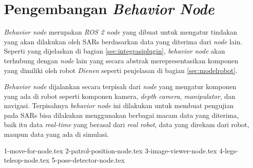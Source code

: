 \section{Pengembangan \emph{Behavior Node}}
\label{sec:behaviornode}

\emph{Behavior node} merupakan \emph{ROS 2 node} yang dibuat untuk mengatur tindakan yang akan dilakukan oleh SARs berdasarkan data yang diterima dari \emph{node} lain.
Seperti yang dijelaskan di bagian \ref{sec:integrasiplugin},
  \emph{behavior node} akan terhubung dengan \emph{node} lain yang secara abstrak merepresentasikan komponen yang dimiliki oleh robot \emph{Dienen} seperti penjelasan di bagian \ref{sec:modelrobot}.

\emph{Behavior node} dijalankan secara terpisah dari \emph{node} yang mengatur komponen yang ada di robot seperti komponen kamera, \emph{depth camera}, \emph{manipulator}, dan navigasi.
Terpisahnya \emph{behavior node} ini dilakukan untuk membuat pengujian pada SARs bisa dilakukan menggunakan berbagai macam data yang diterima,
  baik itu data \emph{real-time} yang berasal dari \emph{real robot},
  data yang direkam dari robot,
  maupun data yang ada di simulasi.

{1-move-for-node.tex}
{2-patrol-position-node.tex}
{3-image-viewer-node.tex}
{4-legs-teleop-node.tex}
{5-pose-detector-node.tex}
